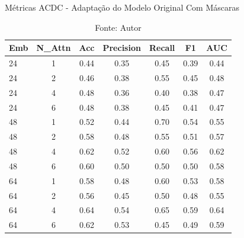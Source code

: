 \begin{table}[htbp]
\centering
\caption{Métricas ACDC - Adaptação do Modelo Original Com Máscaras}
\begin{tabular}{lcccccc}
\toprule
\textbf{Emb} & \textbf{N\_Attn} & \textbf{Acc} & \textbf{Precision} & \textbf{Recall} & \textbf{F1} & \textbf{AUC} \\
\midrule
24 & 1 & 0.44 & 0.35 & 0.45 & 0.39 & 0.44 \\
24 & 2 & 0.46 & 0.38 & 0.55 & 0.45 & 0.48 \\
24 & 4 & 0.48 & 0.36 & 0.40 & 0.38 & 0.47 \\
24 & 6 & 0.48 & 0.38 & 0.45 & 0.41 & 0.47 \\
\hline
48 & 1 & 0.52 & 0.44 & 0.70 & 0.54 & 0.55 \\
48 & 2 & 0.58 & 0.48 & 0.55 & 0.51 & 0.57 \\
48 & 4 & 0.62 & 0.52 & 0.60 & 0.56 & 0.62 \\
48 & 6 & 0.60 & 0.50 & 0.50 & 0.50 & 0.58 \\
\hline
64 & 1 & 0.58 & 0.48 & 0.60 & 0.53 & 0.58 \\
64 & 2 & 0.56 & 0.45 & 0.50 & 0.48 & 0.55 \\
64 & 4 & 0.64 & 0.54 & 0.65 & 0.59 & 0.64 \\
64 & 6 & 0.62 & 0.53 & 0.45 & 0.49 & 0.59 \\
\bottomrule
\end{tabular}
\caption*{Fonte: Autor}
\label{tab:metrics_acdc_orig_mask}
\end{table}


